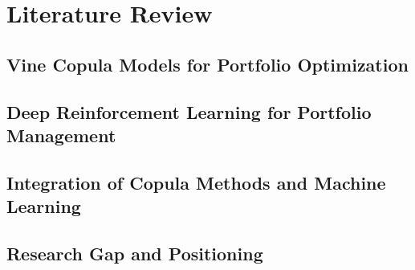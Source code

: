 \section{Literature Review} 
\label{sec:lit_review}



\subsection{Vine Copula Models for Portfolio Optimization}

\subsection{Deep Reinforcement Learning for Portfolio Management}

\subsection{Integration of Copula Methods and Machine Learning}

\subsection{Research Gap and Positioning}

